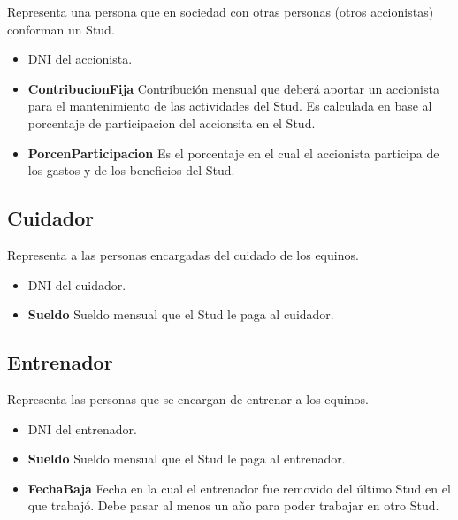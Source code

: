 \documentclass[a4paper,11pt]{article}
\begin{document}
Representa una persona que en sociedad con otras personas (otros accionistas)
conforman un Stud.

\begin{itemize}

  \item \textbf{\uline{}} DNI del accionista.

  \item \textbf{ContribucionFija} Contribución mensual que deberá aportar
    un accionista para el mantenimiento de las actividades del Stud. Es calculada
    en base al porcentaje de participacion del accionsita en el Stud.

  \item \textbf{PorcenParticipacion} Es el porcentaje en el cual el accionista 
  participa de los gastos y de los beneficios del Stud. 

\end{itemize}

\subsection{Cuidador}

Representa a las personas encargadas del cuidado de los equinos.

\begin{itemize}

  \item \textbf{\uline{}} DNI del cuidador.

  \item \textbf{Sueldo} Sueldo mensual que el Stud le paga al cuidador.
  
\end{itemize}

\subsection{Entrenador}

Representa las personas que se encargan de entrenar a los equinos.

\begin{itemize}

  \item \textbf{\uline{}} DNI del entrenador.

  \item \textbf{Sueldo} Sueldo mensual que el Stud le paga al entrenador.

  \item \textbf{FechaBaja} Fecha en la cual el entrenador fue removido del 
    último Stud en el que trabajó. Debe pasar al menos un año para poder
    trabajar en otro Stud. 
  
\end{itemize}
\end{document}

